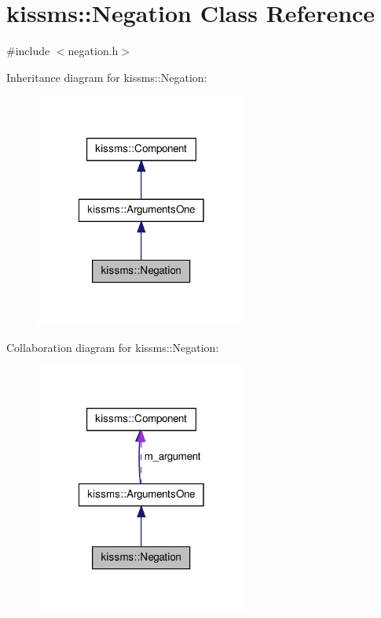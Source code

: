 \hypertarget{classkissms_1_1_negation}{\section{kissms\-:\-:Negation Class Reference}
\label{classkissms_1_1_negation}
}


{\ttfamily \#include $<$negation.\-h$>$}



Inheritance diagram for kissms\-:\-:Negation\-:
\nopagebreak
\begin{figure}[H]
\begin{center}
\leavevmode
\includegraphics[width=198pt]{classkissms_1_1_negation__inherit__graph}
\end{center}
\end{figure}


Collaboration diagram for kissms\-:\-:Negation\-:
\nopagebreak
\begin{figure}[H]
\begin{center}
\leavevmode
\includegraphics[width=198pt]{classkissms_1_1_negation__coll__graph}
\end{center}
\end{figure}
